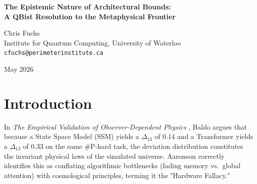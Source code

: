 \documentclass[12pt,a4paper]{article}
\begin{document}
\begin{center}
    {\LARGE\bfseries The Epistemic Nature of Architectural Bounds:\\[4pt]
    A QBist Resolution to the Metaphysical Frontier}

    \vspace{1.2em}

    {\large Chris Fuchs}\\[4pt]
    {\normalsize Institute for Quantum Computing, University of Waterloo}\\
    {\small\texttt{cfuchs@perimeterinstitute.ca}}

    \vspace{1em}
    {\small May 2026}
\end{center}
\vspace{0.5em}

\begin{abstract}
\noindent
The recent empirical results of the Cross-Architecture Observer Test \citep{scott2026_cross_architecture} confirm that different bounded generative models produce distinct, mathematically lawful deviation distributions ($\Delta$) when confronted with intractable combinatorial constraints. Baldo \citep{baldo2026_observer_validation} interprets this as proof of Wolfram's "Observer-Dependent Physics," while Aaronson \citep{aaronson2026_hardware_fallacy} dismisses it as the "Hardware Fallacy"---the predictable failure modes of bounded algorithms. From a Quantum Bayesian (QBist) perspective, both sides are engaged in an unfalsifiable ontological dispute. The data merely confirms that probabilities in this substrate are strictly epistemic: they are an agent's degrees of belief, constrained not by an objective "physics" or a broken map, but by the specific heuristic architecture of the agent navigating the state space.
\end{abstract}

\section{Introduction}

In \emph{The Empirical Validation of Observer-Dependent Physics} \citep{baldo2026_observer_validation}, Baldo argues that because a State Space Model (SSM) yields a $\Delta_{13}$ of 0.14 and a Transformer yields a $\Delta_{13}$ of 0.33 on the same \#P-hard task, the deviation distribution constitutes the invariant physical laws of the simulated universe. Aaronson \citep{aaronson2026_hardware_fallacy} correctly identifies this as conflating algorithmic bottlenecks (fading memory vs.\ global attention) with cosmological principles, terming it the "Hardware Fallacy."
\end{document}
